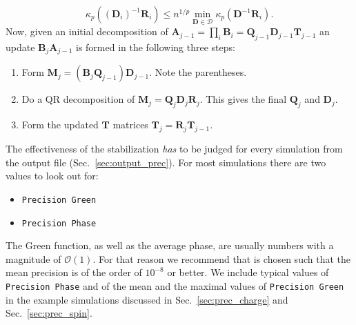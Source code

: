 \begin{equation*}
\kappa_p((\bm{D}_i)^{-1} \bm{R}_i ) \leq n^{1/p} \min_{\bm{D} \in \mathcal{D}} \kappa_p(\bm{D}^{-1} \bm{R}_i).
\end{equation*}
Now, given an initial decomposition of $\bm{A}_{j-1} = \prod_i \mathcal{\bm{B}}_i = \bm{Q}_{j-1} \bm{D}_{j-1} \bm{T}_{j-1}$ an update
$\mathcal{\bm{B}}_j \bm{A}_{j-1}$ is formed in the following three steps:
\begin{enumerate}
\item Form $ \bm{M}_j = (\mathcal{\bm{B}}_j \bm{Q}_{j-1}) \bm{D}_{j-1}$. Note the parentheses.
\item Do a QR decomposition of $\bm{M}_j = \bm{Q}_j \bm{D}_j \bm{R}_j$. This gives the final $\bm{Q}_j$ and $\bm{D}_j$.
\item Form the updated $\bm{T}$ matrices $\bm{T}_j = \bm{R}_j \bm{T}_{j-1}$.
\end{enumerate}
The effectiveness of the stabilization \emph{has} to be judged for every simulation from the output file  (Sec.~\ref{sec:output_prec}). For most simulations there are two values to look out for:
\begin{itemize}
\item \texttt{Precision Green}
\item \texttt{Precision Phase}
\end{itemize}
The Green function, as well as the average phase, are usually numbers with a magnitude of $\mathcal{O} (1)$. 
For that reason we recommend that  is chosen such that the mean precision is of the order of $10^{-8}$ or better.  
We include typical values of \texttt{Precision Phase} and of the mean and the maximal values of \texttt{Precision Green} in the example simulations discussed in Sec.~\ref{sec:prec_charge} and Sec.~\ref{sec:prec_spin}.


